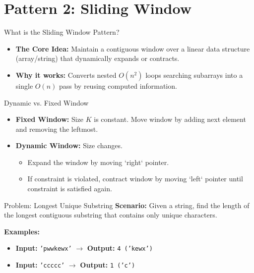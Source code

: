 \section{Pattern 2: Sliding Window}

\begin{frame}[c]{\empty}
    \begin{center}
        \Large\textbf{\secname}
    \end{center}
\end{frame}

\begin{frame}{What is the Sliding Window Pattern?}
  \begin{itemize}
    \item \textbf{The Core Idea:} Maintain a contiguous window over a linear data structure (array/string) that dynamically expands or contracts.
    \item \textbf{Why it works:} Converts nested $O(n^2)$ loops searching subarrays into a single $O(n)$ pass by reusing computed information.
  \end{itemize}
\end{frame}

\begin{frame}{Dynamic vs. Fixed Window}
  \begin{itemize}
    \item \textbf{Fixed Window:} Size $K$ is constant. Move window by adding next element and removing the leftmost.
    \item \textbf{Dynamic Window:} Size changes.
      \begin{itemize}
        \item Expand the window by moving `right` pointer.
        \item If constraint is violated, contract window by moving `left` pointer until constraint is satisfied again.
      \end{itemize}
  \end{itemize}
\end{frame}

\begin{frame}[fragile]{Problem: Longest Unique Substring}
  \textbf{Scenario:}
  Given a string, find the length of the longest contiguous substring that contains only unique characters.
  
  \vspace{0.3cm}
  \textbf{Examples:}
  \begin{itemize}
    \item \textbf{Input:} \texttt{'pwwkewx'} $\rightarrow$ \textbf{Output:} \texttt{4 ('kewx')}
    \item \textbf{Input:} \texttt{'ccccc'} $\rightarrow$ \textbf{Output:} \texttt{1 ('c')}
  \end{itemize}
\end{frame}



